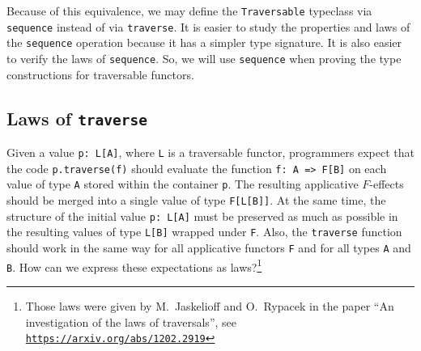 Because of this equivalence, we may define the \lstinline!Traversable!
typeclass via \lstinline!sequence! instead of via \lstinline!traverse!.
It is easier to study the properties and laws of the \lstinline!sequence!
operation because it has a simpler type signature. It is also easier
to verify the laws of \lstinline!sequence!. So, we will use \lstinline!sequence!
when proving the type constructions for traversable functors.

\subsection{Laws of \texttt{traverse}}

Given a value \lstinline!p: L[A]!, where \lstinline!L! is a traversable
functor, programmers expect that the code \lstinline!p.traverse(f)!
should evaluate the function \lstinline!f: A => F[B]! on each value
of type \lstinline!A! stored within the container \lstinline!p!.
The resulting applicative $F$-effects should be merged into a single
value of type \lstinline!F[L[B]]!. At the same time, the structure
of the initial value \lstinline!p: L[A]! must be preserved as much
as possible in the resulting values of type \lstinline!L[B]! wrapped
under \lstinline!F!. Also, the \lstinline!traverse! function should
work in the same way for all applicative functors \lstinline!F! and
for all types \lstinline!A! and \lstinline!B!. How can we express
these expectations as laws?\footnote{Those laws were given by M.~Jaskelioff and
O.~Rypacek in the paper \textsf{``}An investigation of the laws of traversals\textsf{''},
see \texttt{\href{https://arxiv.org/abs/1202.2919}{https://arxiv.org/abs/1202.2919}}}

